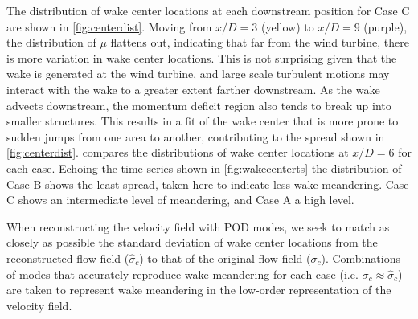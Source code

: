 \documentclass[aip,amsmath,amssymb,preprint,]{revtex4-1}
\begin{document}
The distribution of wake center locations at each downstream position for Case C are shown in \cref{fig:centerdist}.
Moving from $x/D=3$ (yellow) to $x/D=9$ (purple), the distribution of $\mu$ flattens out, indicating that far from the wind turbine, there is more variation in wake center locations.
This is not surprising given that the wake is generated at the wind turbine, and large scale turbulent motions may interact with the wake to a greater extent farther downstream.
As the wake advects downstream, the momentum deficit region also tends to break up into smaller structures. 
This results in a fit of the wake center that is more prone to sudden jumps from one area to another, contributing to the spread shown in \cref{fig:centerdist}.
 compares the distributions of wake center locations at $x/D=6$ for each case.
Echoing the time series shown in \cref{fig:wakecenterts} the distribution of Case B shows the least spread, taken here to indicate less wake meandering. 
Case C shows an intermediate level of meandering, and Case A a high level.


When reconstructing the velocity field with POD modes, we seek to match as closely as possible the standard deviation of wake center locations from the reconstructed flow field ($\hat{\sigma}_c$) to that of the original flow field ($\sigma_c$).
Combinations of modes that accurately reproduce wake meandering for each case (i.e. $\sigma_c\approx\hat{\sigma}_c$) are taken to represent wake meandering in the low-order representation of the velocity field. 
\end{document}
